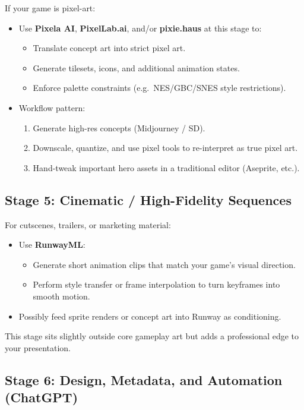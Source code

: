 \documentclass[11pt]{article}
\begin{document}
If your game is pixel-art:

\begin{itemize}
    \item Use \textbf{Pixela AI}, \textbf{PixelLab.ai}, and/or \textbf{pixie.haus} at this stage to:
    \begin{itemize}
        \item Translate concept art into strict pixel art.
        \item Generate tilesets, icons, and additional animation states.
        \item Enforce palette constraints (e.g.\ NES/GBC/SNES style restrictions).
    \end{itemize}
    \item Workflow pattern:
    \begin{enumerate}
        \item Generate high-res concepts (Midjourney / SD).
        \item Downscale, quantize, and use pixel tools to re-interpret as true pixel art.
        \item Hand-tweak important hero assets in a traditional editor (Aseprite, etc.).
    \end{enumerate}
\end{itemize}

\subsection{Stage 5: Cinematic / High-Fidelity Sequences}

For cutscenes, trailers, or marketing material:

\begin{itemize}
    \item Use \textbf{RunwayML}:
    \begin{itemize}
        \item Generate short animation clips that match your game's visual direction.
        \item Perform style transfer or frame interpolation to turn keyframes into smooth motion.
    \end{itemize}
    \item Possibly feed sprite renders or concept art into Runway as conditioning.
\end{itemize}

This stage sits slightly outside core gameplay art but adds a professional edge to your presentation.

\subsection{Stage 6: Design, Metadata, and Automation (ChatGPT)}
\end{document}
